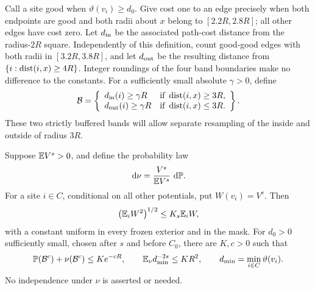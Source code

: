 Call a site good when \(\vartheta(v_i)\ge d_0\). Give cost one to an
edge precisely when both endpoints are good and both radii about \(x\)
belong to \([2.2R,2.8R]\); all other edges have cost zero. Let
\(d_{\rm in}\) be the associated path-cost distance from the radius-\(2R\)
square. Independently of this definition, count good-good edges with
both radii in \([3.2R,3.8R]\), and let \(d_{\rm out}\) be the resulting
distance from \(\{i:\operatorname{dist}(i,x)\ge4R\}\). Integer roundings of the four
band boundaries make no difference to the constants. For a sufficiently
small absolute \(\gamma>0\), define
\begin{equation}\label{boot:barrier-event}
 \mathcal B=\left\{
 \begin{array}{ll}
 d_{\rm in}(i)\ge\gamma R&\text{if }\operatorname{dist}(i,x)\ge3R,\\
 d_{\rm out}(i)\ge\gamma R&\text{if }\operatorname{dist}(i,x)\le3R.
 \end{array}\right\}.
\end{equation}
These two strictly buffered bands will allow separate resampling of the
inside and outside of radius \(3R\).

\begin{lemma}\label{boot:tilted}
Suppose \(\mathbb E V^s>0\), and define the probability law
\[
                      \,\mathrm d\nu=\frac{V^s}{\mathbb E V^s}\,\,\mathrm d\mathbb P.
\]
For a site \(i\in C\), conditional on all other potentials, put
\(W(v_i)=V^s\). Then
\begin{equation}\label{boot:l2l1}
       \bigl(\mathbb E_i W^2\bigr)^{1/2}\le K_s\mathbb E_i W,
\end{equation}
with a constant uniform in every frozen exterior and in the mask.
For \(d_0>0\) sufficiently small, chosen after \(s\) and before \(C_0\),
there are \(K,c>0\) such that
\begin{equation}\label{boot:tilted-barriers}
 \mathbb P(\mathcal B^c)+\nu(\mathcal B^c)\le K e^{-cR},
 \qquad
 \mathbb E_\nu d_{\min}^{-2s}\le K R^2,
 \qquad d_{\min}=\min_{i\in C}\vartheta(v_i).
\end{equation}
No independence under \(\nu\) is asserted or needed.
\end{lemma}

